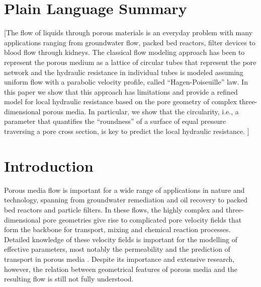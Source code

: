 \documentclass[draft]{agujournal2019}
\begin{document}
\section*{Plain Language Summary}
[The flow of liquids through porous materials is an everyday problem with many applications ranging from groundwater flow, packed bed reactors, filter devices to blood flow through kidneys. The classical flow modeling approach has been to represent the porous medium as a lattice of circular tubes that represent the pore network and the hydraulic resistance in individual tubes is modeled assuming uniform flow with a parabolic velocity profile, called “Hagen-Poiseuille” law. In this paper we show that this approach has limitations and provide a refined model for local hydraulic resistance based on the pore geometry of complex three-dimensional porous media. In particular, we show that the circularity, i.e., a parameter that quantifies the “roundness” of a surface of equal pressure traversing a pore cross section, is key to predict the local hydraulic resistance.
]


%
%

\section{Introduction}

Porous media flow is important for a wide range of applications in nature and technology, spanning from groundwater remediation and oil recovery to packed bed reactors and particle filters. In these flows, the highly complex and three-dimensional pore geometries give rise to complicated pore velocity fields that form the backbone for transport, mixing and chemical reaction processes. Detailed knowledge of these velocity fields is important for the modelling of effective parameters, most notably the permeability and the prediction of transport in porous media \cite{bear_dynamics_1972,scheidegger_physics_1974}. Despite its importance and extensive research, however, the relation between geometrical features of porous media and the resulting flow is still not fully understood.
\end{document}
